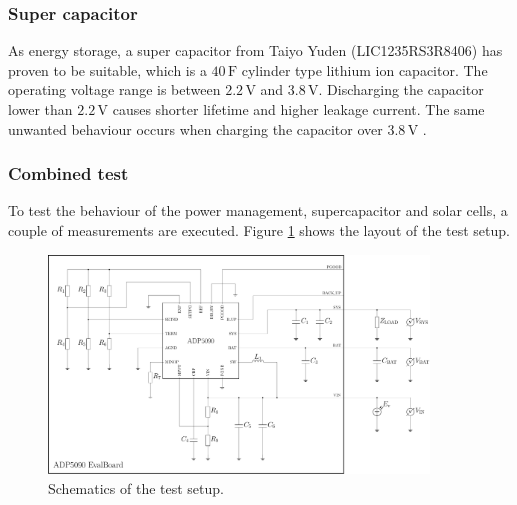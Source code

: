 \subsubsection{Super capacitor}
As energy storage, a super capacitor from Taiyo Yuden (LIC1235RS3R8406) has proven to be suitable, which is a $40\,\text{F}$ cylinder type lithium ion capacitor.
The operating voltage range is between $2.2\,\text{V}$ and $3.8\,\text{V}$.
Discharging the capacitor lower than $2.2\,\text{V}$ causes shorter lifetime and higher leakage current.
The same unwanted behaviour occurs when charging the capacitor over $3.8\,\text{V}$ \cites{yuden}.

\subsubsection{Combined test}
To test the behaviour of the power management, supercapacitor and solar cells, a couple of measurements are executed.
Figure \ref{development:test} shows the layout of the test setup.

\begin{figure}[ht]
	\centering
	\includegraphics[width=0.9\textwidth]{4-development/hardware/graphics/testaufbau.pdf}
	\caption{Schematics of the test setup.\label{development:test}}
\end{figure}

